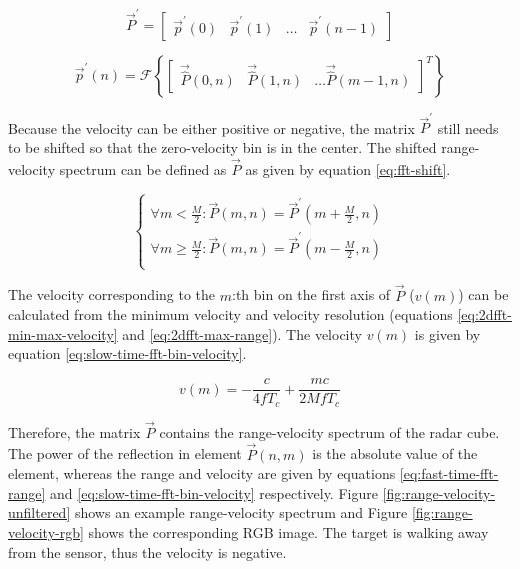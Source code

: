 \begin{equation}
    \label{eq:slow-time-fft-matrix}
    \vec{P}^{\prime} = \begin{bmatrix} \vec{p}^{\prime}(0) & \vec{p}^{\prime}(1) & \ldots & \vec{p}^{\prime}(n-1)\end{bmatrix}
\end{equation}

\begin{equation}
    \label{eq:slow-time-fft}
    \vec{p}^{\prime}(n) = \mathcal{F} \left \{ \begin{bmatrix} \vec{\hat P}(0, n) & \vec{\hat P}(1, n) & \ldots \vec{\hat P}(m-1, n) \end{bmatrix}^T \right \}
\end{equation}

Because the velocity can be either positive or negative, the matrix $\vec{P}^{\prime}$ still needs to be shifted so
that the zero-velocity bin is in the center.
The shifted range-velocity spectrum can be defined as $\vec{P}$ as given by equation \ref{eq:fft-shift}.

\begin{equation}
    \label{eq:fft-shift}
    \begin{cases}
        \forall m < \frac{M}{2} : \vec{P}(m, n) = \vec{P}^{\prime}(m + \frac{M}{2}, n) \\
        \forall m \ge \frac{M}{2} : \vec{P}(m, n) = \vec{P}^{\prime}(m - \frac{M}{2}, n) \\
    \end{cases}
\end{equation}

The velocity corresponding to the $m$:th bin on the first axis of $\vec{P}$ ($v(m)$) can be calculated from the 
minimum velocity and velocity resolution (equations \ref{eq:2dfft-min-max-velocity} and \ref{eq:2dfft-max-range}).
The velocity $v(m)$ is given by equation \ref{eq:slow-time-fft-bin-velocity}.

\begin{equation}
    \label{eq:slow-time-fft-bin-velocity}
    v(m) = -\frac{c}{4 f T_{c}} + \frac{m c}{2 M f T_{c}}
\end{equation}

Therefore, the matrix $\vec{P}$ contains the range-velocity spectrum of the radar cube.
The power of the reflection in element $\vec{P}(n, m)$ is the absolute value of the element,
whereas the range and velocity are given by equations 
\ref{eq:fast-time-fft-range} and \ref{eq:slow-time-fft-bin-velocity} respectively.
Figure \ref{fig:range-velocity-unfiltered} shows an example range-velocity spectrum
and Figure \ref{fig:range-velocity-rgb} shows the corresponding RGB image.
The target is walking away from the sensor, thus the velocity is negative.

